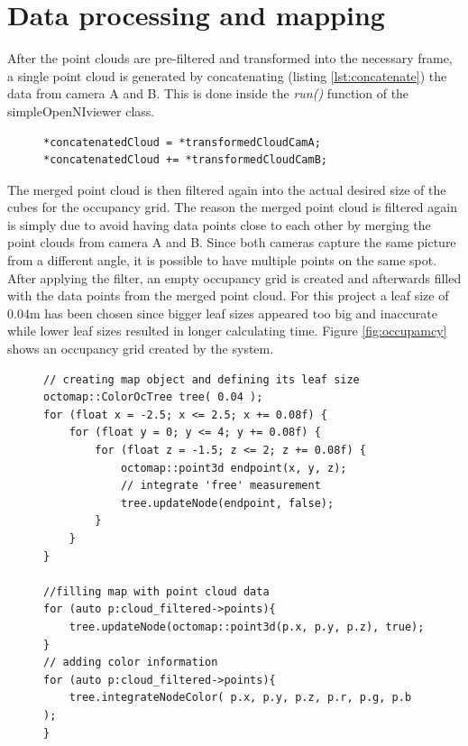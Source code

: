 \section{Data processing and mapping}
\label{sec:process}
After the point clouds are pre-filtered and transformed into the necessary frame, a single point cloud is generated by concatenating (listing \ref{lst:concatenate}) the data from camera A and B. This is done inside the \emph{run()} function of the simpleOpenNIviewer class.
\begin{figure}[H]
\begin{lstlisting}[frame = single, caption={merging the point clouds from camera A and B into a single point cloud by concatenating the data.}, captionpos=b, label={lst:concatenate}]
*concatenatedCloud = *transformedCloudCamA;
*concatenatedCloud += *transformedCloudCamB;
\end{lstlisting} 
\end{figure}
The merged point cloud is then filtered again into the actual desired size of the cubes for the occupancy grid. The reason the merged point cloud is filtered again is simply due to avoid having data points close to each other by merging the point clouds from camera A and B. Since both cameras capture the same picture from a different angle, it is possible to have multiple points on the same spot. After applying the filter, an empty occupancy grid is created and afterwards filled with the data points from the merged point cloud. For this project a leaf size of 0.04m has been chosen since bigger leaf sizes appeared too big and inaccurate while lower leaf sizes resulted in longer calculating time. Figure \ref{fig:occupamcy} shows an occupancy grid created by the system.
\begin{figure}[H]
\begin{lstlisting}[frame = single, caption={Creating an empty occupancy grid of a specified leaf size. Then filling it with th point cloud data}, captionpos=b, label={lst:emptymap}]  
// creating map object and defining its leaf size
octomap::ColorOcTree tree( 0.04 ); 
for (float x = -2.5; x <= 2.5; x += 0.08f) { 
	for (float y = 0; y <= 4; y += 0.08f) {
		for (float z = -1.5; z <= 2; z += 0.08f) {
			octomap::point3d endpoint(x, y, z);
			// integrate 'free' measurement
			tree.updateNode(endpoint, false); 
		}
	}
}

//filling map with point cloud data
for (auto p:cloud_filtered->points){
	tree.updateNode(octomap::point3d(p.x, p.y, p.z), true);
}
// adding color information
for (auto p:cloud_filtered->points){
	tree.integrateNodeColor( p.x, p.y, p.z, p.r, p.g, p.b );
}
\end{lstlisting}
\end{figure}

